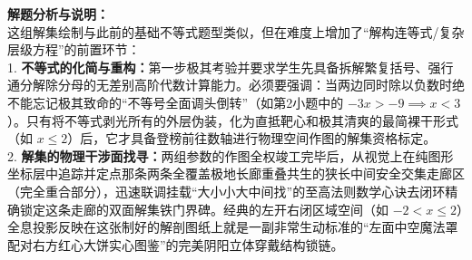 \documentclass[12pt, a4paper]{ctexrep}
\begin{document}
{\small\color{gray}
\textbf{解题分析与说明：}\\
这组解集绘制与此前的基础不等式题型类似，但在难度上增加了“解构连等式/复杂层级方程”的前置环节：\\
1. \textbf{不等式的化简与重构：}第一步极其考验并要求学生先具备拆解繁复括号、强行通分解除分母的无差别高阶代数计算能力。必须要强调：当两边同时除以负数时绝不能忘记极其致命的“不等号全面调头倒转”（如第2小题中的 $-3x > -9 \implies x < 3$）。只有将不等式剥光所有的外层伪装，化为直抵靶心和极其清爽的最简裸干形式（如 $x \leqslant 2$）后，它才具备登榜前往数轴进行物理空间作图的解集资格标定。\\
2. \textbf{解集的物理干涉面找寻：}两组参数的作图全权竣工完毕后，从视觉上在纯图形坐标层中追踪并定点那条两条全覆盖极地长廊重叠共生的狭长中间安全交集走廊区（完全重合部分），迅速联调挂载“大小小大中间找”的至高法则数学心诀去闭环精确锁定这条走廊的双面解集铁门界碑。经典的左开右闭区域空间（如 $-2 < x \leqslant 2$）全息投影反映在这张制好的解剖图纸上就是一副非常生动标准的“左面中空魔法罩配对右方红心大饼实心图鉴”的完美阴阳立体穿戴结构锁链。
}

\vspace{0.6cm}
\end{document}
